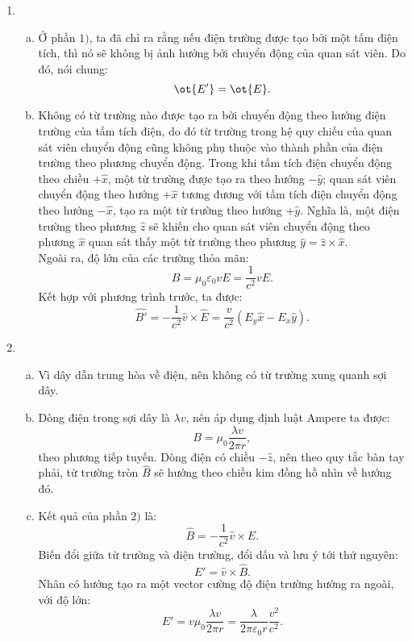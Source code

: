 \begin{loigiai}
{\begin{enumerate}[1)]
    \item 
    \begin{enumerate}[a)]
        \item Ở phần $1)$, ta đã chỉ ra rằng nếu điện trường được tạo bởi một tấm điện tích, thì nó sẽ không bị ảnh hưởng bởi chuyển động của quan sát viên. Do đó, nói chung:
        $$\ot{{E'}}=\ot{{E}}.$$
        \item Không có từ trường nào được tạo ra bởi chuyển động theo hướng điện trường của tấm tích điện, do đó từ trường trong hệ quy chiếu của quan sát viên chuyển động cũng không phụ thuộc vào thành phần của điện trường theo phương chuyển động. Trong khi tấm tích điện chuyển động theo chiều $+\hat{{x}}$, một từ trường được tạo ra theo hướng $-\hat{{y}}$; quan sát viên chuyển động theo hướng $+\hat{{x}}$ tương đương với tấm tích điện chuyển động theo hướng $-\hat{{x}}$, tạo ra một từ trường theo hướng $+\hat{{y}}$. Nghĩa là, một điện trường theo phương $\hat{{z}}$ sẽ khiến cho quan sát viên chuyển động theo phương $\hat{{x}}$ quan sát thấy một từ trường theo phương $\hat{{y}}=\hat{{z}}\times\hat{{x}}$.\\
        Ngoài ra, độ lớn của các trường thỏa mãn:
        $$B=\mu_0\varepsilon_0 v E=\dfrac{1}{c^2}vE.$$
        Kết hợp với phương trình trước, ta được:
        $$
\hat{{B'}}=-\dfrac{1}{c^{2}} \hat{{v}} \times \hat{{E}}=\dfrac{v}{c^{2}}\left(E_{y} \hat{{x}}-E_{x} \hat{{y}}\right).
$$
    \end{enumerate}
    \item 
    \begin{enumerate}[a)]
        \item Vì dây dẫn trung hòa về điện, nên không có từ trường xung quanh sợi dây.
        \item Dòng điện trong sợi dây là $\lambda v$, nên áp dụng định luật Ampere ta được:
        $$B=\mu_0\dfrac{\lambda v}{2\pi r},$$
        theo phương tiếp tuyến. Dòng điện có chiều $-\hat{{z}}$, nên theo quy tắc bàn tay phải, từ trường tròn $\hat{{B}}$ sẽ hướng theo chiều kim đồng hồ nhìn về hướng đó.
        \item Kết quả của phần $2)$ là:
        $$\hat{{B}}=-\dfrac{1}{c^2}\hat{{v}}\times \hat{{E}}.$$
        Biến đổi giữa từ trường và điện trường, đổi dấu và lưu ý tới thứ nguyên:
        $$\hat{{E'}}=\hat{{v}}\times\hat{{B}}.$$
        Nhân có hướng tạo ra một vector cường độ điện trường hướng ra ngoài, với độ lớn:
        $$E'=v\mu_0\dfrac{\lambda v}{2\pi r}=\dfrac{\lambda}{2\pi\varepsilon_0 r}\dfrac{v^2}{c^2}.$$

\end{enumerate}
\end{enumerate}}
\end{loigiai}
